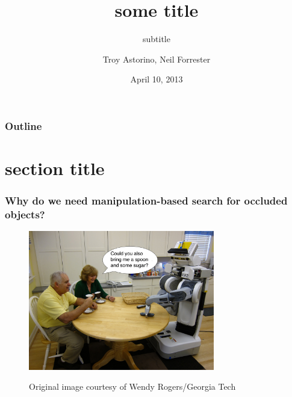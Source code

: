 \documentclass{beamer}
\title{some title}
\subtitle{subtitle}
\author{Troy Astorino, Neil Forrester}
\date{April 10, 2013}
\institute[6.834 -- MIT]{Cognitive Robotics \\ Massachusetts Institute of Technology}
\begin{document}
\begin{frame}
	\maketitle
\end{frame}

\begin{frame}
	\frametitle{Outline}
	\tableofcontents
\end{frame}

\section{section title}
\begin{frame}
	\frametitle{Why do we need manipulation-based search for occluded
          objects?}
        \begin{figure}
          \centering
          \includegraphics[width=3.2in]{img/robot_in_kitchen.jpg}

          \tiny{Original image courtesy of Wendy Rogers/Georgia Tech}
        \end{figure}
\end{frame}
\end{document}
